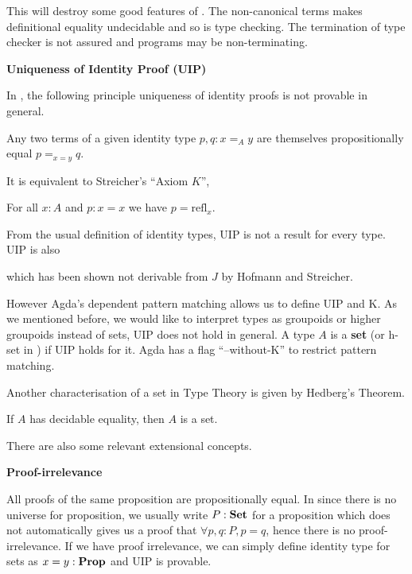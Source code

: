 This will destroy some good features of \itt. The non-canonical terms makes definitional equality undecidable and so is type checking. The termination of type checker is not assured and programs may be non-terminating.



\textbf{Uniqueness of Identity Proof (UIP)}

In \itt, the following principle uniqueness of identity proofs is not provable in general.

\begin{definition}\label{UIP}
Any two terms of a given identity type $p,q : x =_{A} y$ are themselves propositionally equal $p =_{x = y} q$.
\end{definition}

It is equivalent to Streicher’s “Axiom $K$”,

\begin{axiom}[$K$]
For all $x:A$ and $p: x=x$ we have $p=\text{refl}_{x}$.

From the usual definition of identity types, UIP is not a result for every type. UIP is also 
\end{axiom}

which has been shown not derivable from $J$ by Hofmann and Streicher. 

However Agda's dependent pattern matching allows us to define UIP and K.
As we mentioned before, we would like to interpret types as groupoids or higher groupoids instead of sets, UIP does not hold in general. A type $A$ is a \textbf{set} (or h-set in \hott) if UIP holds for it.
Agda has a flag ``--without-K'' to restrict pattern matching.

Another characterisation of a set in Type Theory is given by Hedberg's Theorem.
\begin{theorem}[Hedberg]
If $A$ has decidable equality, then $A$ is a set.
\end{theorem}


There are also some relevant extensional concepts.

\textbf{Proof-irrelevance} 

All proofs of the same proposition are propositionally equal. In \itt since there is no universe for proposition, we usually write $P : \operatorname{\mathbf{Set}}$ for a proposition which does not automatically gives us a proof that $\forall p, q : P, p = q$, hence there is no proof-irrelevance. If we have proof irrelevance, we can simply define identity type for sets as $x = y : \operatorname{\mathbf{Prop}}$ and UIP is provable.

